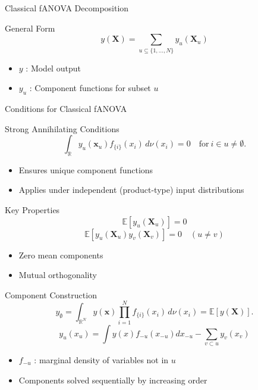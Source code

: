 \begin{frame}{Classical fANOVA Decomposition} %
  \begin{block}{General Form}
    \[
      y(\boldsymbol{X}) = \sum_{u \subseteq \{1,\dots,N\}} y_{u}(\boldsymbol{X}_u)
    \]
  \end{block}
  \begin{itemize}
    \item $y$ : Model output
    \item $y_u$ : Component functions for subset $u$
  \end{itemize}
\end{frame}

\begin{frame}{Conditions for Classical fANOVA} %
  \begin{block}{Strong Annihilating Conditions}
    \[
      \int_{\mathbb{R}} y_u(\boldsymbol{x}_u) f_{\{i\}}(x_i) \, d\nu(x_i) = 0 \quad \text{for} \ i \in u \neq \emptyset.
    \]
  \end{block}
  \begin{itemize}
    \item Ensures unique component functions
    \item Applies under independent (product-type) input distributions
  \end{itemize}
\end{frame}

\begin{frame}{Key Properties}
  \[
    \mathbb{E}[y_u(\boldsymbol{X}_u)] = 0
  \]
  \[
    \mathbb{E}[y_u(\boldsymbol{X}_u) y_v(\boldsymbol{X}_v)] = 0 \quad (u \neq v)
  \]
  \begin{itemize}
    \item Zero mean components
    \item Mutual orthogonality
  \end{itemize}
\end{frame}

\begin{frame}{Component Construction} %
    \[
    y_{\emptyset} = \int_{\mathbb{R}^N} y(\boldsymbol{x}) \prod_{i=1}^{N} f_{\{i\}}(x_i) \, d\nu (x_i) = \mathbb{E}[y(\boldsymbol{X})].
    \]
    \[
      y_u(x_u) =
        \int y(x) f_{-u}(x_{-u}) dx_{-u}
        - \sum_{v \subset u} y_v(x_v)
    \]
  \begin{itemize}
    \item $f_{-u}$ : marginal density of variables not in $u$
    \item Components solved sequentially by increasing order
  \end{itemize}
\end{frame}

